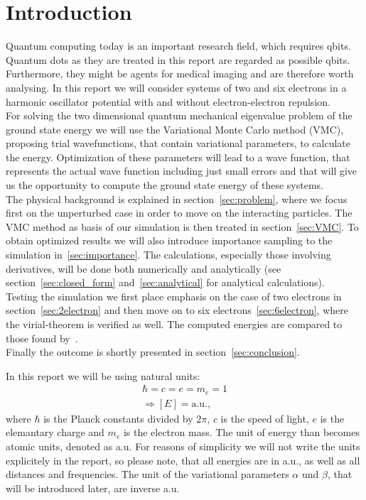 \section{Introduction}
Quantum computing today is an important research field, which requires qbits. Quantum dots as they are treated in this report are regarded as possible qbits. Furthermore, they might be agents for medical imaging and are therefore worth analysing. In this report we will consider systems of two and six electrons in a harmonic oscillator potential with and without electron-electron repulsion.\\
For solving the two dimensional quantum mechanical eigenvalue problem of the ground state energy we will use the Variational Monte Carlo method (VMC), proposing trial wavefunctions, that contain variational parameters, to calculate the energy. Optimization of these parameters will lead to a wave function, that represents the actual wave function including just small errors and that will give us the opportunity to compute the ground state energy of these systems.\\
The physical background is explained in section~\ref{sec:problem}, where we focus first on the unperturbed case in order to move on the interacting particles. The VMC method as basis of our simulation is then treated in section~\ref{sec:VMC}. To obtain optimized results we will also introduce importance sampling to the simulation in~\ref{sec:importance}. The calculations, especially those involving derivatives, will be done both numerically and analytically (see section~\ref{sec:closed_form} and~\ref{sec:analytical} for analytical calculations).\\
Testing the simulation we first place emphasis on the case of two electrons in section~\ref{sec:2electron} and then move on to six electrons~\ref{sec:6electron}, where the virial-theorem is verified as well. The computed energies are compared to those found by~\cite{hogberget2013}.\\
Finally the outcome is shortly presented in section~\ref{sec:conclusion}.\\ \bigskip

In this report we will be using natural units:
\begin{align*}
\hbar = c = e = m_e = 1\\
\Rightarrow [E] = \mathrm{a.u.},
\end{align*}
where $\hbar$ is the Planck constants divided by $2\pi$, $c$ is the speed of light, $e$ is the elemantary charge and $m_e$ is the electron mass. The unit of energy than becomes atomic units, denoted as a.u. For reasons of simplicity we will not write the units explicitely in the report, so please note, that all energies are in a.u., as well as all distances and frequencies. The unit of the variational parameters $\alpha$ und $\beta$, that will be introduced later, are inverse a.u.